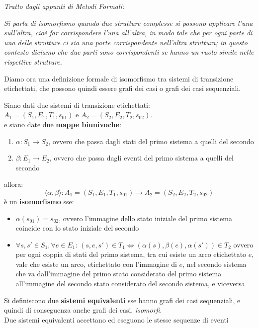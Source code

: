 \documentclass[a4paper,12pt, oneside]{book}
\begin{document}
\begin{shaded}
  \textit{Tratto dagli appunti di Metodi Formali:}\\
\begin{center}
  \textit{Si parla di isomorfismo quando due strutture complesse si possono
    applicare l'una sull'altra, cioè far corrispondere l'una all'altra, in modo
    tale che per ogni parte di una delle strutture ci sia una parte
    corrispondente nell'altra struttura; in questo contesto diciamo che due
    parti sono corrispondenti se hanno un ruolo simile nelle rispettive
    strutture.}
\end{center}
Diamo ora una definizione formale di isomorfismo tra sistemi di transizione
etichettati, che possono quindi essere grafi dei casi o grafi dei casi
sequenziali.
\begin{definizione}
  Siano dati due sistemi di transizione etichettati:\\
  $A_1 = (S_1,E_1,T_1,s_{01})$ e $A_2 = (S_2 , E_2 , T_2 , s_{02})$.\\
  e siano date due \textbf{mappe biunivoche}:
  \begin{enumerate}
    \item $\alpha:S_1\to S_2$, ovvero che passa dagli stati del primo sistema a
    quelli del secondo
    \item $\beta:E_1\to E_2$, ovvero che passa dagli eventi del primo sistema a
    quelli del secondo
  \end{enumerate}
  allora:
  \[\langle \alpha,\beta\rangle:A_1= (S_1 , E_1 , T_1 ,s_{01})\to A_2 = (S_2 ,
    E_2 , T_2 , s_{02})\]
  è un \textbf{isomorfismo} sse:
  \begin{itemize}
    \item $\alpha(s_{01})=s_{02}$, ovvero l'immagine dello stato iniziale del
    primo sistema coincide con lo stato iniziale del secondo
    \item $\forall s,s'\in S_1,\forall e\in E_1:\,(s,e,s')\in T_1
    \Leftrightarrow (\alpha(s),\beta(e),\alpha(s'))\in T_2$ ovvero per ogni
    coppia di stati del primo sistema, tra cui esiste un arco etichettato $e$,
    vale che esiste un arco, etichettato con l'immagine di $e$, nel secondo
    sistema che va dall'immagine del primo stato considerato del primo sistema
    all'immagine del secondo stato considerato del secondo sistema, e viceversa
  \end{itemize}
\end{definizione}
\begin{definizione}
  Si definiscono due \textbf{sistemi equivalenti} sse hanno grafi dei casi
  sequenziali, e quindi di conseguenza anche grafi dei casi, \emph{isomorfi}.\\
  Due sistemi equivalenti accettano ed eseguono le stesse sequenze di eventi
\end{definizione}
\end{shaded}
\end{document}
